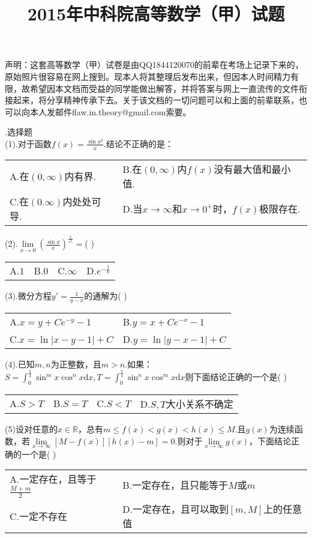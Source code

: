 \documentclass[UTF8]{ctexart}
\date{}
\author{}
\begin{document}
\title{2015年中科院高等数学（甲）试题}
\maketitle
\thispagestyle{empty}
声明：这套高等数学（甲）试卷是由QQ1844120070的前辈在考场上记录下来的，原始照片很容易在网上搜到。现本人将其整理后发布出来，但因本人时间精力有限，故希望因本文档而受益的同学能做出解答，并将答案与网上一直流传的文件衔接起来，将分享精神传承下去。关于该文档的一切问题可以和上面的前辈联系，也可以向本人发邮件flaw.in.theory@gmail.com索要。

.选择题\\
(1).对于函数$ f(x)=\frac{\sin{x^2}}{x} $.结论不正确的是：\\
\begin{tabular}{ll}
	A.在$ (0,\infty) $内有界.&
	B.在$ (0,\infty) $内$ f(x) $没有最大值和最小值.\\
	C.在$ (0.\infty) $内处处可导.&
	D.当$ x\rightarrow\infty $和$ x\rightarrow0^+ $时，$ f(x) $极限存在.
\end{tabular}

\noindent(2).$ \lim\limits_{x\rightarrow0}(\frac{\sin{x}}{x})^\frac{1}{x^2}= $(	)\\
\begin{tabular}{llll}
	A.$ 1 $& B.$ 0 $& C.$ \infty $& D.$ e^{-\frac{1}{6}} $
\end{tabular}

\noindent(3).微分方程$ y'=\frac{1}{y-x} $的通解为(	)\\
\begin{tabular}{ll}
	A.$ x=y+Ce^{-y}-1 $&
	B.$ y=x+Ce^{-x}-1 $\\
	C.$ x=\ln\left|x-y-1\right|+C $&
	D.$ y=\ln\left|y-x-1\right|+C$
\end{tabular}

\noindent(4).已知$ m,n $为正整数，且$ m>n $.如果：$ S=\int_{0}^{\frac{\pi}{4}}\sin^m{x}\cos^n{x}\mathrm{d}x,T=\int_{0}^{\frac{\pi}{4}}\sin^n{x}\cos^m{x}\mathrm{d}x $则下面结论正确的一个是(	)\\
\begin{tabular}{llll}
	A.$ S>T $& B.$ S=T $& C.$ S<T $& D.$ S,T $大小关系不确定
\end{tabular}

\noindent(5)设对任意的$ x\in\mathbb{R} $，总有$ m\le f(x)<g(x)<h(x)\le M $.且$ g(x) $为连续函数，若$ \lim\limits_{x\rightarrow\infty}[M-f(x)][h(x)-m]=0. $则对于$ \lim\limits_{x\rightarrow\infty}g(x) $，下面结论正确的一个是(	)\\
\begin{tabular}{ll}
	A.一定存在，且等于$ \frac{M+m}{2} $&
	B.一定存在，且只能等于$ M $或$ m $\\
	C.一定不存在&
	D.一定存在，且可以取到$ [m,M] $上的任意值
\end{tabular}
\end{document}
